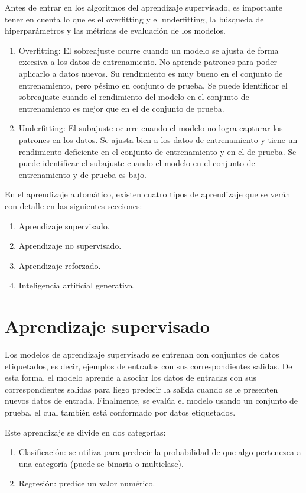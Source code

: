 \documentclass[a4paper, 12pt]{book}
\begin{document}
Antes de entrar en los algoritmos del aprendizaje supervisado, es importante tener en cuenta lo que es el overfitting y el underfitting, la búsqueda de hiperparámetros y las métricas de evaluación de los modelos.
\begin{enumerate}
	\item Overfitting: El sobreajuste ocurre cuando un modelo se ajusta de forma excesiva a los datos de entrenamiento. No aprende patrones para poder aplicarlo a datos nuevos. Su rendimiento es muy bueno en el conjunto de entrenamiento, pero pésimo en conjunto de prueba. Se puede identificar el sobreajuste cuando el rendimiento del modelo en el conjunto de entrenamiento es mejor que en el de conjunto de prueba.
	\item Underfitting: El subajuste ocurre cuando el modelo no logra capturar los patrones en los datos. Se ajusta bien a los datos de entrenamiento y tiene un rendimiento deficiente en el conjunto de entrenamiento y en el de prueba. Se puede identificar el subajuste cuando el modelo en el conjunto de entrenamiento y de prueba es bajo.
\end{enumerate}


En el aprendizaje automático, existen cuatro tipos de aprendizaje que se verán con detalle en las siguientes secciones:
\begin{enumerate}
	\item Aprendizaje supervisado.
	\item Aprendizaje no supervisado.
	\item Aprendizaje reforzado.
	\item Inteligencia artificial generativa.
\end{enumerate}

\section{Aprendizaje supervisado}
Los modelos de aprendizaje supervisado se entrenan con conjuntos de datos etiquetados, es decir, ejemplos de entradas con sus correspondientes salidas. De esta forma, el modelo aprende a asociar los datos de entradas con sus correspondientes salidas para liego predecir la salida cuando se le presenten nuevos datos de entrada. Finalmente, se evalúa el modelo usando un conjunto de prueba, el cual también está conformado por datos etiquetados.

Este aprendizaje se divide en dos categorías:
\begin{enumerate}
	\item Clasificación: se utiliza para predecir la probabilidad de que algo pertenezca a una categoría (puede se binaria o multiclase).
	\item Regresión: predice un valor numérico.
\end{enumerate}
\end{document}
